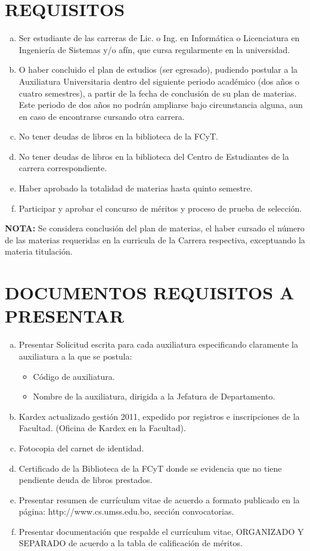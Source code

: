 \documentclass[letterpaper,11pt]{article}
\begin{document}
\section{REQUISITOS}
\begin{enumerate}[a)]
\item Ser estudiante de las carreras de Lic. o Ing. en Informática o Licenciatura en Ingeniería de Sistemas y/o afín, que cursa regularmente en la universidad.
\item O haber concluido el plan de estudios (ser egresado), pudiendo postular a la Auxiliatura Universitaria dentro del siguiente periodo académico (dos años o cuatro semestres), a partir de la fecha de conclusión de su plan de materias. Este periodo de dos años no podrán ampliarse bajo circunstancia alguna, aun en caso de encontrarse cursando otra carrera.
\item No tener deudas de libros en la biblioteca de la FCyT.
\item No tener deudas de libros en la biblioteca del Centro de Estudiantes de la carrera correspondiente.
\item Haber aprobado la totalidad de materias hasta quinto semestre.
\item Participar y aprobar el concurso de méritos y proceso de prueba de selección.
\end{enumerate}

\textbf{NOTA:} Se considera conclusión del plan de materias, el haber cursado el número de las materias requeridas en la curricula de la Carrera respectiva, exceptuando la materia titulación. 

\section{DOCUMENTOS REQUISITOS A PRESENTAR}
\begin{enumerate}[a)]
\item Presentar Solicitud escrita para cada auxiliatura especificando claramente la auxiliatura a la que se postula:
\begin{itemize}
\item Código de auxiliatura.
\item Nombre de la auxiliatura, dirigida a la Jefatura de Departamento.
\end{itemize}
\item Kardex actualizado gestión 2011, expedido por registros e inscripciones de la Facultad. (Oficina de Kardex en la Facultad).
\item Fotocopia del carnet de identidad.
\item Certificado de la Biblioteca de la FCyT donde se evidencia que no tiene pendiente deuda de libros prestados.
\item Presentar resumen de currículum vitae de acuerdo a formato publicado en la página: http://www.cs.umss.edu.bo, sección convocatorias.
\item Presentar documentación que respalde el currículum vitae, ORGANIZADO Y SEPARADO de acuerdo a la tabla de calificación de méritos.
\end{enumerate}
\end{document}
